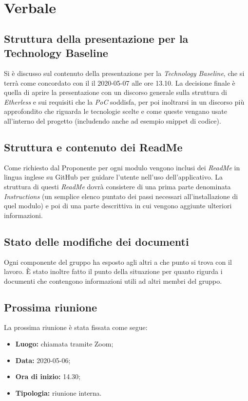 \section{Verbale}
	
	\subsection{Struttura della presentazione per la Technology Baseline}
	Si è discusso sul contenuto della presentazione per la \textit{Technology Baseline}, che si terrà come concordato con il \RC{} il 2020-05-07 alle ore 13.10. La decisione finale è quella di aprire la presentazione con un discorso generale sulla struttura di \textit{Etherless} e sui requisiti che la \textit{PoC} soddisfa, per poi inoltrarsi in un discorso più approfondito che riguarda le tecnologie scelte e come queste vengano usate all'interno del progetto (includendo anche ad esempio snippet di codice).
	
	\subsection{Struttura e contenuto dei ReadMe}
	Come richiesto dal Proponente per ogni modulo vengono inclusi dei \textit{ReadMe} in lingua inglese su GitHub per guidare l'utente nell'uso dell'applicativo. La struttura di questi \textit{ReadMe} dovrà consistere di una prima parte denominata \textit{Instructions} (un semplice elenco puntato dei passi necessari all'installazione di quel modulo) e poi di una parte descrittiva in cui vengono aggiunte ulteriori informazioni.
	
		\subsection{Stato delle modifiche dei documenti}
	Ogni componente del gruppo ha esposto agli altri a che punto si trova con il lavoro. È stato inoltre fatto il punto della situazione per quanto rigurda i documenti che contengono informazioni utili ad altri membri del gruppo.
			
	\subsection{Prossima riunione}
		La prossima riunione è stata fissata come segue:
		\begin{itemize}
			\item{\textbf{Luogo:} chiamata tramite Zoom; }
			\item{\textbf{Data:} 2020-05-06;}
			\item{\textbf{Ora di inizio:} 14.30;}
			\item{\textbf{Tipologia:} riunione interna.}
		\end{itemize}

